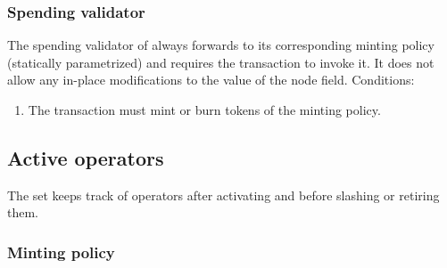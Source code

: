 \documentclass[../midgard.tex]{subfiles}
\begin{document}
\subsubsection{Spending validator}
\label{h:registered-operators-spending-validator}

The spending validator of  always forwards to its corresponding minting policy (statically parametrized) and requires the transaction to invoke it.
It does not allow any in-place modifications to the  value of the node  field.
Conditions:
\begin{enumerate}
    \item The transaction must mint or burn tokens of the  minting policy.
\end{enumerate}

\subsection{Active operators}
\label{h:active-operators}

The  set keeps track of operators after activating and before slashing or retiring them.

\subsubsection{Minting policy}
\label{h:active-operators-minting-policy}
\end{document}
